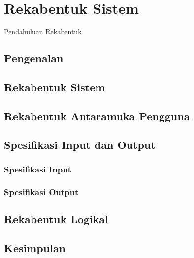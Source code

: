 \chapter{Rekabentuk Sistem}\label{c1}
Pendahuluan Rekabentuk

\section{Pengenalan}

\section{Rekabentuk Sistem}

\section{Rekabentuk Antaramuka Pengguna}
\section{Spesifikasi Input dan Output}
\subsection{Spesifikasi Input}
\subsection{Spesifikasi Output}
\section{Rekabentuk Logikal}
\section{Kesimpulan}


